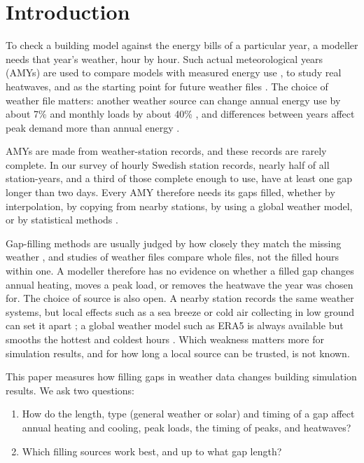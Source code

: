 \section{Introduction}\label{sec:1}

To check a building model against the energy bills of a particular year, a modeller needs that year's weather, hour by hour. Such actual meteorological years (AMYs) are used to compare models with measured energy use \citep{ashrae2014,steenenglund2020}, to study real heatwaves, and as the starting point for future weather files \citep{rodrigues2023}. The choice of weather file matters: another weather source can change annual energy use by about 7\% and monthly loads by about 40\% \citep{bhandari2012}, and differences between years affect peak demand more than annual energy \citep{hong2013}.

AMYs are made from weather-station records, and these records are rarely complete. In our survey of hourly Swedish station records, nearly half of all station-years, and a third of those complete enough to use, have at least one gap longer than two days. Every AMY therefore needs its gaps filled, whether by interpolation, by copying from nearby stations, by using a global weather model, or by statistical methods \citep{wilcox2008,korner2018,smith2021}.

Gap-filling methods are usually judged by how closely they match the missing weather \citep{korner2018,nrel2021,ieapvps2023,jacobs2024}, and studies of weather files compare whole files, not the filled hours within one. A modeller therefore has no evidence on whether a filled gap changes annual heating, moves a peak load, or removes the heatwave the year was chosen for. The choice of source is also open. A nearby station records the same weather systems, but local effects such as a sea breeze or cold air collecting in low ground can set it apart \citep{miller2003,daly2010}; a global weather model such as ERA5 is always available but smooths the hottest and coldest hours \citep{lopes2024}. Which weakness matters more for simulation results, and for how long a local source can be trusted, is not known.

This paper measures how filling gaps in weather data changes building simulation results. We ask two questions:

\begin{enumerate}
\item
  How do the length, type (general weather or solar) and timing of a gap affect annual heating and cooling, peak loads, the timing of peaks, and heatwaves?
\item
  Which filling sources work best, and up to what gap length?
\end{enumerate}


